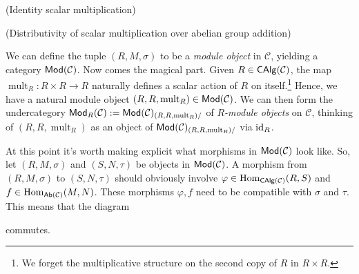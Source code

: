\documentclass[11pt]{article}
\renewcommand{\C}{\mathcal{C}}
\renewcommand{\phi}{\varphi}
\DeclareMathOperator{\add}{add} %
\DeclareMathOperator{\mult}{mult} %
\begin{document}
\begin{enum}{\roman}
\item[] (Identity scalar multiplication)

\begin{center}
\end{center}

\item[] (Distributivity of scalar multiplication over abelian group addition)

\begin{center}
\end{center}
\end{enum}

We can define the tuple $(R,M,\sigma)$ to be a \emph{module object} in $\C$, yielding a category $\Mod(\C)$. Now comes the magical part. Given $R\in\CAlg(\C)$, the map $\mult_R: R\times R\to R$ naturally defines a scalar action of $R$ on itself.\footnote{We forget the multiplicative structure on the second copy of $R$ in $R\times R$.} Hence, we have a natural module object $(R,R,\mult_R)\in\Mod(\C)$. We can then form the undercategory $\Mod_R(\C):=\Mod(\C)_{(R,R,\mult_R)/}$ of \emph{$R$-module objects} on $\C$, thinking of $(R,R,\mult_R)$ as an object of $\Mod(\C)_{(R,R,\mult_R)/}$ via $\operatorname{id}_R$. 

At this point it's worth making explicit what morphisms in $\Mod(\C)$ look like. So, let $(R,M,\sigma)$ and $(S,N,\tau)$ be objects in $\Mod(\C)$. A morphism from $(R,M,\sigma)$ to $(S,N,\tau)$ should obviously involve $\phi\in\Hom_{\CAlg(\C)}(R,S)$ and $f\in\Hom_{\Ab(\C)}(M,N)$. These morphisms $\phi,f$ need to be compatible with $\sigma$ and $\tau$. This means that the diagram
\begin{center}
\end{center}
commutes.
\end{document}
